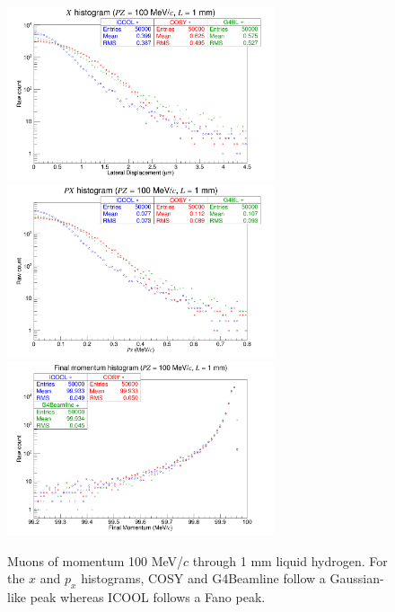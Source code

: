 \begin{figure}[H]
  \centering
    \includegraphics[width=0.7\textwidth]{Benchmarking/LH/X.100.1.png} 
    \includegraphics[width=0.7\textwidth]{Benchmarking/LH/PX.100.1.png} 
    \includegraphics[width=0.7\textwidth]{Benchmarking/LH/strag.100.1.png} 
  \caption[Muons of momentum 100 MeV/$c$ through 1 mm liquid hydrogen.]{Muons of momentum 100 MeV/$c$ through 1 mm liquid hydrogen. For the $x$ and $p_x$ histograms, COSY and G4Beamline follow a Gaussian-like peak whereas ICOOL follows a Fano peak.}
  \label{fig:100.1}
\end{figure}

